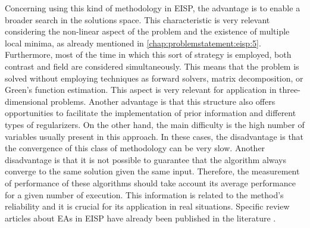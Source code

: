 		Concerning using this kind of methodology in EISP, the advantage is to enable a broader search in the solutions space. This characteristic is very relevant considering the non-linear aspect of the problem and the existence of multiple local minima, as already mentioned in \autoref{chap:problemstatement:eisp:5}. Furthermore, most of the time in which this sort of strategy is employed, both contrast and field are considered simultaneously. This means that the problem is solved without employing techniques as forward solvers, matrix decomposition, or Green's function estimation. This aspect is very relevant for application in three-dimensional problems. Another advantage is that this structure also offers opportunities to facilitate the implementation of prior information and different types of regularizers. On the other hand, the main difficulty is the high number of variables usually present in this approach. In these cases, the disadvantage is that the convergence of this class of methodology can be very slow. Another disadvantage is that it is not possible to guarantee that the algorithm always converge to the same solution given the same input. Therefore, the measurement of performance of these algorithms should take account its average performance for a given number of execution. This information is related to the method's reliability and it is crucial for its application in real situations. Specific review articles about EAs in EISP have already been published in the literature \citep{pastorino2007stochastic,rocca2009evolutionary}.
		
